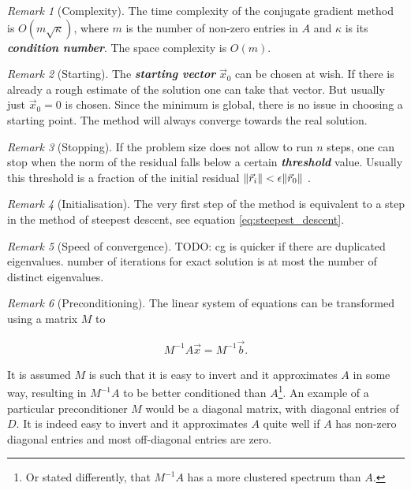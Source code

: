 \documentclass{article}
\theoremstyle{plain} %
\theoremstyle{convention} %
\theoremstyle{remark} %
\newtheorem*{remark}{Remark} %
\def\df#1{\textbf{\textit{#1}}}
\numberwithin{equation}{section}
\begin{document}
\begin{remark}[Complexity]
    The time complexity of the conjugate gradient method is $O(m \sqrt{\kappa})$, where $m$ is the number of non-zero entries in $A$ and $\kappa$ is its \df{condition number}. The space complexity is $O(m)$.
\end{remark}

\begin{remark}[Starting]
    The \df{starting vector} $\vec{x}_0$ can be chosen at wish. If there is already a rough estimate of the solution one can take that vector. But usually just $\vec{x}_0 = 0$ is chosen. Since the minimum is global, there is no issue in choosing a starting point. The method will always converge towards the real solution.
\end{remark}

\begin{remark}[Stopping]
    If the problem size does not allow to run $n$ steps, one can stop when the norm of the residual falls below a certain \df{threshold} value. Usually this threshold is a fraction of the initial residual $\norm{\vec{r}_i} < \epsilon \norm{\vec{r}_0}$ \cite{shewchuk1994}.
\end{remark}

\begin{remark}[Initialisation]
    The very first step of the method is equivalent to a step in the method of steepest descent, see equation \eqref{eq:steepest_descent}.
\end{remark}

\begin{remark}[Speed of convergence]
    TODO: cg is quicker if there are duplicated eigenvalues. number of iterations for exact solution is at most the number of distinct eigenvalues.
\end{remark}

\begin{remark}[Preconditioning]
    The linear system of equations can be transformed using a matrix $M$ to

    \begin{align*}
        M^{-1} A \vec{x} = M^{-1} \vec{b}.
    \end{align*}

    It is assumed $M$ is such that it is easy to invert and it approximates $A$ in some way, resulting in $M^{-1} A$ to be better conditioned than $A$\footnote{Or stated differently, that $M^{-1}A$ has a more clustered spectrum than $A$.}. An example of a particular preconditioner $M$ would be a diagonal matrix, with diagonal entries of $D$. It is indeed easy to invert and it approximates $A$ quite well if $A$ has non-zero diagonal entries and most off-diagonal entries are zero.
\end{remark}
\end{document}
